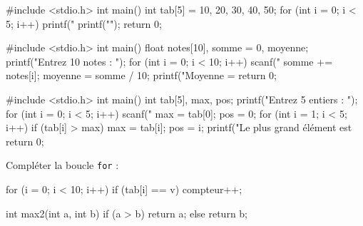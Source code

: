 
\begin{ccode}
#include <stdio.h>
int main() {
    int tab[5] = {10, 20, 30, 40, 50};
    for (int i = 0; i < 5; i++) {
        printf("%
    }
    printf("\n");
    return 0;
}
\end{ccode}

\begin{ccode}
#include <stdio.h>
int main() {
    float notes[10], somme = 0, moyenne;
    printf("Entrez 10 notes : ");
    for (int i = 0; i < 10; i++) {
        scanf("%
        somme += notes[i];
    }
    moyenne = somme / 10;
    printf("Moyenne = %
    return 0;
}
\end{ccode}

\begin{ccode}
#include <stdio.h>
int main() {
    int tab[5], max, pos;
    printf("Entrez 5 entiers : ");
    for (int i = 0; i < 5; i++) {
        scanf("%
    }
    max = tab[0];
    pos = 0;
    for (int i = 1; i < 5; i++) {
        if (tab[i] > max) {
            max = tab[i];
            pos = i;
        }
    }
    printf("Le plus grand élément est %
    return 0;
}
\end{ccode}

Compléter la boucle \texttt{for} :
\begin{ccode}
for (i = 0; i < 10; i++) {
    if (tab[i] == v) {
        compteur++;
    }
}
\end{ccode}

\begin{ccode}
int max2(int a, int b) {
    if (a > b) {
        return a;
    } else {
        return b;
    }
}
\end{ccode}

